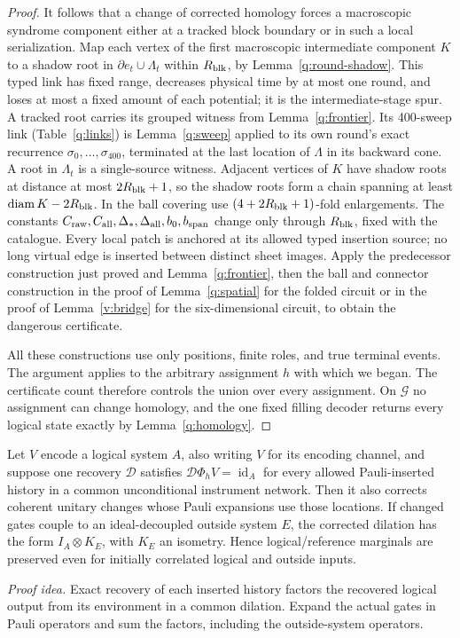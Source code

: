 \begin{proof}
It follows that a change of corrected homology forces a
macroscopic syndrome component either at a tracked block boundary
or in such a local serialization. Map each vertex of the first macroscopic intermediate component \(K\)
to a shadow root in \(\partial e_t\cup\Lambda_t\) within
\(R_{\rm blk}\), by Lemma~\ref{q:round-shadow}. This typed link has
fixed range, decreases physical time by at most one round, and loses
at most a fixed amount of each potential; it is the intermediate-stage
spur. A tracked root carries its grouped witness from
Lemma~\ref{q:frontier}. Its 400-sweep link (Table~\ref{q:links}) is
Lemma~\ref{q:sweep} applied to its own round's exact recurrence
\(\sigma_0,\ldots,\sigma_{400}\), terminated at the last location
of \(\Lambda\) in its backward cone. A root in \(\Lambda_t\)
is a single-source witness. Adjacent vertices of \(K\) have shadow
roots at distance at most \(2R_{\rm blk}+1\), so the shadow roots
form a chain spanning at least \(\operatorname{diam}K-2R_{\rm blk}\).
In the ball covering use \((4+2R_{\rm blk}+1)\)-fold enlargements.
The constants \(C_{\rm raw},C_{\rm all},\Delta_*,\Delta_{\rm all},
b_0,b_{\rm span}\) change only through \(R_{\rm blk}\), fixed
with the catalogue. Every local patch is
anchored at its allowed typed insertion source; no long virtual
edge is inserted between distinct sheet images. Apply the
predecessor construction just proved and Lemma~\ref{q:frontier},
then the ball and connector construction in the proof of Lemma~\ref{q:spatial}
for the folded circuit or in the proof of Lemma~\ref{v:bridge} for the
six-dimensional circuit, to obtain the dangerous certificate.

All these constructions use only positions, finite roles, and true
terminal events. The argument applies to the arbitrary assignment
\(h\) with which we began. The certificate count therefore controls
the union over every assignment. On \(\mathcal G\) no assignment
can change homology, and the one fixed filling decoder returns every
logical state exactly by Lemma~\ref{q:homology}.
\end{proof}

\begin{lemma}\label{q:span}
Let \(V\) encode a logical system \(A\), also writing \(V\) for its encoding channel,
and suppose one recovery
\(\mathcal D\) satisfies \(\mathcal D\Phi_hV=\operatorname{id}_A\)
for every allowed Pauli-inserted history in a common unconditional
instrument network. Then it also corrects coherent unitary changes
whose Pauli expansions use those locations. If changed gates couple
to an ideal-decoupled outside system \(E\), the corrected dilation
has the form \(I_A\otimes K_E\), with \(K_E\) an isometry. Hence
logical/reference marginals are preserved even for initially
correlated logical and outside inputs.
\end{lemma}
\par\noindent\emph{Proof idea.} Exact recovery of each inserted history factors the recovered logical output from its environment in a common dilation. Expand the actual gates in Pauli operators and sum the factors, including the outside-system operators.

